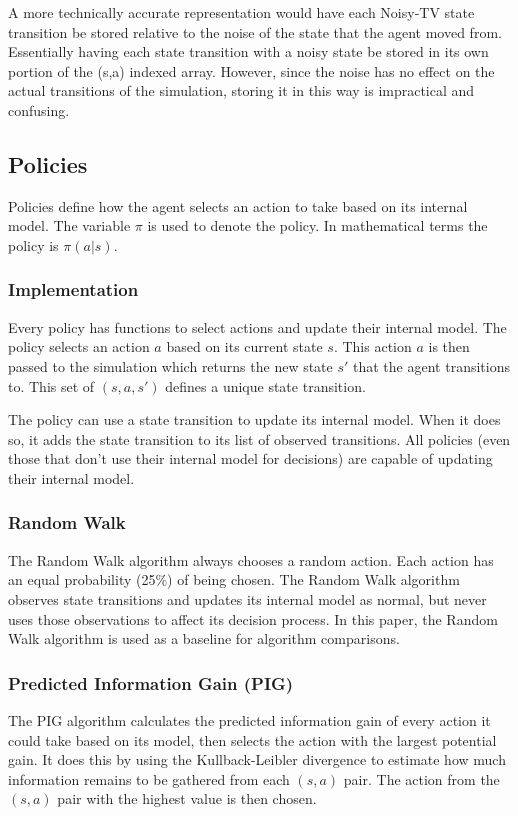 \documentclass[letterpaper]{article} %
\begin{document}
A more technically accurate representation would have each Noisy-TV state transition be stored relative to the noise of the state that the agent moved from. Essentially having each state transition with a noisy state be stored in its own portion of the (s,a) indexed array. However, since the noise has no effect on the actual transitions of the simulation, storing it in this way is impractical and confusing.

\subsection{Policies}
Policies define how the agent selects an action to take based on its internal model. The variable $\pi$ is used to denote the policy. In mathematical terms the policy is $\pi(a | s)$.
\subsubsection{Implementation}
Every policy has functions to select actions and update their internal model. The policy selects an action $a$ based on its current state $s$. This action $a$ is then passed to the simulation which returns the new state $s'$ that the agent transitions to. This set of $(s,a,s')$ defines a unique state transition.

The policy can use a state transition to update its internal model. When it does so, it adds the state transition to its list of observed transitions. All policies (even those that don't use their internal model for decisions) are capable of updating their internal model.
\subsubsection{Random Walk}
The Random Walk algorithm always chooses a random action. Each action has an equal probability (25\%) of being chosen. The Random Walk algorithm observes state transitions and updates its internal model as normal, but never uses those observations to affect its decision process. In this paper, the Random Walk algorithm is used as a baseline for algorithm comparisons.

\subsubsection{Predicted Information Gain (PIG)}
The PIG algorithm calculates the predicted information gain of every action it could take based on its model, then selects the action with the largest potential gain. It does this by using the Kullback-Leibler divergence to estimate how much information remains to be gathered from each $(s,a)$ pair. The action from the $(s,a)$ pair with the highest value is then chosen.
\end{document}
